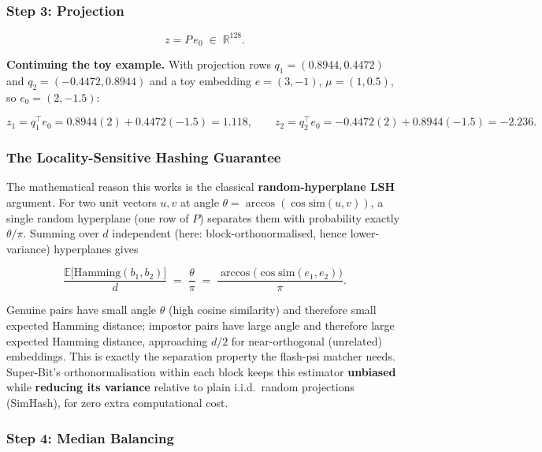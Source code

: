 \documentclass[11pt]{article}
\begin{document}
\subsubsection{Step 3: Projection}

\begin{equation}
z = P\,e_0 \;\in\; \mathbb{R}^{128}.
\end{equation}

\textbf{Continuing the toy example.} With projection rows $q_1=(0.8944,0.4472)$ and
$q_2=(-0.4472,0.8944)$ and a toy embedding $e=(3,-1)$, $\mu=(1,0.5)$, so $e_0 = (2,-1.5)$:

\begin{equation}
z_1 = q_1^{\!\top}e_0 = 0.8944(2) + 0.4472(-1.5) = 1.118, \qquad
z_2 = q_2^{\!\top}e_0 = -0.4472(2) + 0.8944(-1.5) = -2.236.
\end{equation}

\subsubsection{The Locality-Sensitive Hashing Guarantee}

The mathematical reason this works is the classical \textbf{random-hyperplane LSH}
argument. For two unit vectors $u,v$ at angle $\theta = \arccos(\cos\!\mathrm{sim}(u,v))$, a
single random hyperplane (one row of $P$) separates them with probability exactly
$\theta/\pi$. Summing over $d$ independent (here: block-orthonormalised, hence
lower-variance) hyperplanes gives

\begin{equation}
\boxed{\ \dfrac{\mathbb{E}\big[\mathrm{Hamming}(b_1,b_2)\big]}{d}
\;=\; \dfrac{\theta}{\pi}
\;=\; \dfrac{\arccos\!\big(\cos\!\mathrm{sim}(e_1,e_2)\big)}{\pi}. \ }
\end{equation}

Genuine pairs have small angle $\theta$ (high cosine similarity) and therefore small
expected Hamming distance; impostor pairs have large angle and therefore large expected
Hamming distance, approaching $d/2$ for near-orthogonal (unrelated) embeddings. This is
exactly the separation property the flash-psi matcher needs. Super-Bit's orthonormalisation
within each block keeps this estimator \textbf{unbiased} while \textbf{reducing its
variance} relative to plain i.i.d.\ random projections (SimHash), for zero extra
computational cost.

\subsubsection{Step 4: Median Balancing}
\end{document}
